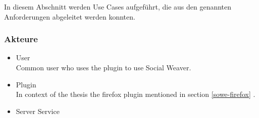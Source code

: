 In diesem Abschnitt werden Use Cases aufgeführt, die aus den genannten Anforderungen abgeleitet werden konnten.

\subsubsection{Akteure}
\begin{itemize}
\item User \\ 
Common user who uses the plugin to use Social Weaver.

\item Plugin \\ 
In context of the thesis the firefox plugin mentioned in section \ref{sowe-firefox} .

\item Server Service \\ 
\end{itemize}

